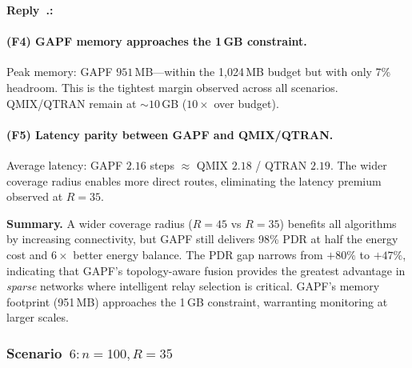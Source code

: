 \documentclass[11pt]{article}
\newcounter{reviewer}
\newcounter{replyctr}[reviewer]
\renewcommand{\thereplyctr}{\thereviewer.\arabic{replyctr}}
\newenvironment{reply}
  {\refstepcounter{replyctr}%
   \addtocounter{replyctr}{-1}%
   \medskip\noindent
   \begin{sf}\textbf{Reply~\thereplyctr:}\ }
  {\addtocounter{replyctr}{1}%
   \medskip\end{sf}}
\begin{document}
\begin{refsection}
\begin{mdframed}[style=Resp]
\begin{reply}
\paragraph{(F4) GAPF memory approaches the 1\,GB constraint.}
Peak memory: GAPF $951$\,MB---within the 1{,}024\,MB budget but with only 7\% headroom. This is the tightest margin observed across all scenarios. QMIX/QTRAN remain at ${\sim}10$\,GB ($10\times$ over budget).

\paragraph{(F5) Latency parity between GAPF and QMIX/QTRAN.}
Average latency: GAPF $2.16$ steps $\approx$ QMIX $2.18$ / QTRAN $2.19$. The wider coverage radius enables more direct routes, eliminating the latency premium observed at $R{=}35$.

\medskip
\noindent\textbf{Summary.} A wider coverage radius ($R{=}45$ vs $R{=}35$) benefits all algorithms by increasing connectivity, but GAPF still delivers 98\% PDR at half the energy cost and $6\times$ better energy balance. The PDR gap narrows from $+80\%$ to $+47\%$, indicating that GAPF's topology-aware fusion provides the greatest advantage in \emph{sparse} networks where intelligent relay selection is critical. GAPF's memory footprint (951\,MB) approaches the 1\,GB constraint, warranting monitoring at larger scales.


\subsubsection{Scenario~$6: n = 100, R = 35$}
\label{sec:results_n100_r35}

\begin{center}
\label{tab:perf_n100_r35}
\end{center}


\end{reply}
\end{mdframed}
\end{refsection}
\end{document}
